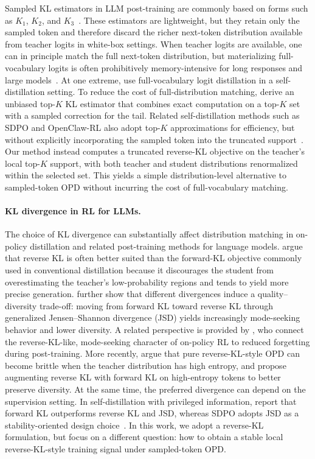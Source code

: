 \documentclass{article}
\begin{document}
Sampled KL estimators in LLM post-training are commonly based on forms such as $K_1$, $K_2$, and $K_3$~\citep{schulman2020kl}. These estimators are lightweight, but they retain only the sampled token and therefore discard the richer next-token distribution available from teacher logits in white-box settings. When teacher logits are available, one can in principle match the full next-token distribution, but materializing full-vocabulary logits is often prohibitively memory-intensive for long responses and large models~\citep{hinton2015distilling,kim2016sequence,opd2023}. At one extreme, \citet{zhao2026opsd} use full-vocabulary logit distillation in a self-distillation setting. To reduce the cost of full-distribution matching, \citet{emapg2026} derive an unbiased top-$K$ KL estimator that combines exact computation on a top-$K$ set with a sampled correction for the tail. Related self-distillation methods such as SDPO and OpenClaw-RL also adopt top-$K$ approximations for efficiency, but without explicitly incorporating the sampled token into the truncated support~\citep{hubotter2026sdpo,wang2026openclawrl}. Our method instead computes a truncated reverse-KL objective on the teacher's local top-$K$ support, with both teacher and student distributions renormalized within the selected set. This yields a simple distribution-level alternative to sampled-token OPD without incurring the cost of full-vocabulary matching.


\paragraph{KL divergence in RL for LLMs.}
The choice of KL divergence can substantially affect distribution matching in on-policy distillation and related post-training methods for language models. \citet{minillm2023} argue that reverse KL is often better suited than the forward-KL objective commonly used in conventional distillation because it discourages the student from overestimating the teacher's low-probability regions and tends to yield more precise generation. \citet{opd2023} further show that different divergences induce a quality--diversity trade-off: moving from forward KL toward reverse KL through generalized Jensen--Shannon divergence (JSD) yields increasingly mode-seeking behavior and lower diversity. A related perspective is provided by \citet{chen2025retaining}, who connect the reverse-KL-like, mode-seeking character of on-policy RL to reduced forgetting during post-training. More recently, \citet{jin2026entropyaware} argue that pure reverse-KL-style OPD can become brittle when the teacher distribution has high entropy, and propose augmenting reverse KL with forward KL on high-entropy tokens to better preserve diversity. At the same time, the preferred divergence can depend on the supervision setting. In self-distillation with privileged information, \citet{zhao2026opsd} report that forward KL outperforms reverse KL and JSD, whereas SDPO adopts JSD as a stability-oriented design choice~\citep{hubotter2026sdpo}. In this work, we adopt a reverse-KL formulation, but focus on a different question: how to obtain a stable local reverse-KL-style training signal under sampled-token OPD.
\end{document}
